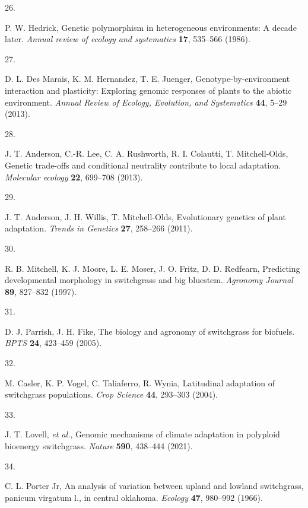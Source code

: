 \documentclass[
  9pt,
  twocolumn,
  twoside]{pnas-new}
\newlength{\cslhangindent}
\newlength{\csllabelwidth}
\newenvironment{CSLReferences}[2] %
 {\begin{list}{}{%
  \setlength{\itemindent}{0pt}
  \setlength{\leftmargin}{0pt}
  \setlength{\parsep}{0pt}
  \ifodd #1
   \setlength{\leftmargin}{\cslhangindent}
   \setlength{\itemindent}{-1\cslhangindent}
  \fi
  \setlength{\itemsep}{#2\baselineskip}}}
 {\end{list}}
\newcommand{\CSLLeftMargin}[1]{\parbox[t]{\csllabelwidth}{\strut#1\strut}}
\newcommand{\CSLRightInline}[1]{\parbox[t]{\linewidth - \csllabelwidth}{\strut#1\strut}}
\begin{document}
\begin{CSLReferences}{0}{1}
\CSLLeftMargin{26. }%
\CSLRightInline{P. W. Hedrick, Genetic polymorphism in heterogeneous
environments: A decade later. \emph{Annual review of ecology and
systematics} \textbf{17}, 535--566 (1986).}

\CSLLeftMargin{27. }%
\CSLRightInline{D. L. Des Marais, K. M. Hernandez, T. E. Juenger,
Genotype-by-environment interaction and plasticity: Exploring genomic
responses of plants to the abiotic environment. \emph{Annual Review of
Ecology, Evolution, and Systematics} \textbf{44}, 5--29 (2013).}

\CSLLeftMargin{28. }%
\CSLRightInline{J. T. Anderson, C.-R. Lee, C. A. Rushworth, R. I.
Colautti, T. Mitchell-Olds, Genetic trade-offs and conditional
neutrality contribute to local adaptation. \emph{Molecular ecology}
\textbf{22}, 699--708 (2013).}

\CSLLeftMargin{29. }%
\CSLRightInline{J. T. Anderson, J. H. Willis, T. Mitchell-Olds,
Evolutionary genetics of plant adaptation. \emph{Trends in Genetics}
\textbf{27}, 258--266 (2011).}

\CSLLeftMargin{30. }%
\CSLRightInline{R. B. Mitchell, K. J. Moore, L. E. Moser, J. O. Fritz,
D. D. Redfearn, Predicting developmental morphology in switchgrass and
big bluestem. \emph{Agronomy Journal} \textbf{89}, 827--832 (1997).}

\CSLLeftMargin{31. }%
\CSLRightInline{D. J. Parrish, J. H. Fike, The biology and agronomy of
switchgrass for biofuels. \emph{BPTS} \textbf{24}, 423--459 (2005).}

\CSLLeftMargin{32. }%
\CSLRightInline{M. Casler, K. P. Vogel, C. Taliaferro, R. Wynia,
Latitudinal adaptation of switchgrass populations. \emph{Crop Science}
\textbf{44}, 293--303 (2004).}

\CSLLeftMargin{33. }%
\CSLRightInline{J. T. Lovell, \emph{et al.}, Genomic mechanisms of
climate adaptation in polyploid bioenergy switchgrass. \emph{Nature}
\textbf{590}, 438--444 (2021).}

\CSLLeftMargin{34. }%
\CSLRightInline{C. L. Porter Jr, An analysis of variation between upland
and lowland switchgrass, panicum virgatum l., in central oklahoma.
\emph{Ecology} \textbf{47}, 980--992 (1966).}


\end{CSLReferences}
\end{document}
